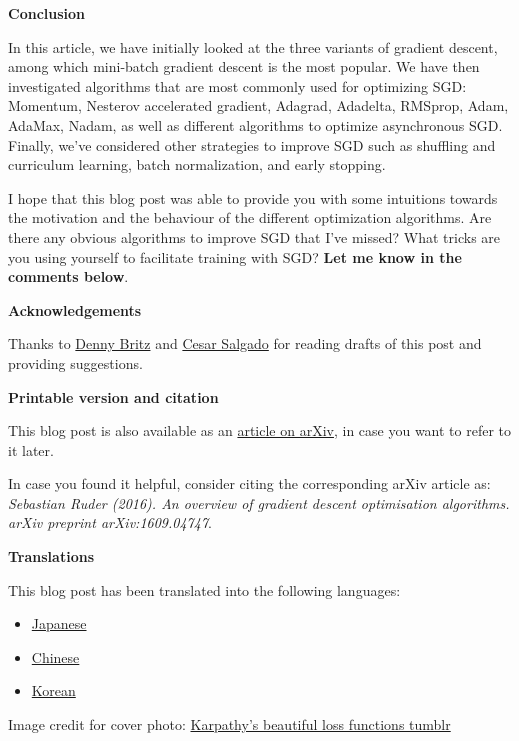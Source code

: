 \documentclass[4pt,journal,compsoc]{IEEEtran}
\begin{document}
\begin{flushleft}
    \textbf{\Large Conclusion} \newline
    
    In this article, we have initially looked at the three variants of gradient descent, among which mini-batch gradient descent is the most popular. We have then investigated algorithms that are most commonly used for optimizing SGD: Momentum, Nesterov accelerated gradient, Adagrad, Adadelta, RMSprop, Adam, AdaMax, Nadam, as well as different algorithms to optimize asynchronous SGD. Finally, we've considered other strategies to improve SGD such as shuffling and curriculum learning, batch normalization, and early stopping.\newline
    
    I hope that this blog post was able to provide you with some intuitions towards the motivation and the behaviour of the different optimization algorithms. Are there any obvious algorithms to improve SGD that I've missed? What tricks are you using yourself to facilitate training with SGD? \textbf{Let me know in the comments below}. \newline \newline
    
    \textbf{\Large Acknowledgements} \newline
     
    Thanks to \underline{Denny Britz} and \underline{Cesar Salgado} for reading drafts of this post and providing suggestions. \newline \newline
     
    \textbf{\Large Printable version and citation
} \newline
     
    This blog post is also available as an \underline{article on arXiv}, in case you want to refer to it later. \newline

    In case you found it helpful, consider citing the corresponding arXiv article as: \\
    \textit{Sebastian Ruder (2016). An overview of gradient descent optimisation algorithms. arXiv preprint arXiv:1609.04747}. \newline \newline
    
    \textbf{\Large Translations} \newline
        
    This blog post has been translated into the following languages: \newline
    
    \begin{itemize}
        \item \underline{Japanese}
        \item \underline{Chinese}
        \item \underline{Korean} \newline
    \end{itemize}
    
    Image credit for cover photo: \underline{Karpathy's beautiful loss functions tumblr}
    
    \end{flushleft} 
    
\end{document}
